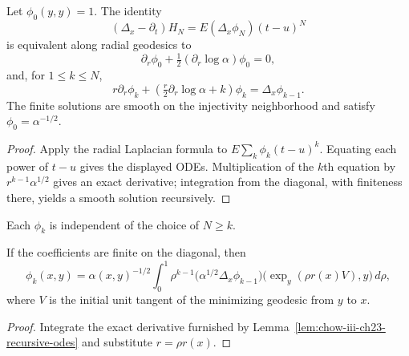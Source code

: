 \begin{lemma}
\label{lem:chow-iii-ch23-recursive-odes}
Let $\phi_0(y,y)=1$.  The identity
\[
(\Delta_x-\partial_t)H_N=E(\Delta_x\phi_N)(t-u)^N
\]
is equivalent along radial geodesics to
\[
\partial_r\phi_0+\tfrac12(\partial_r\log\alpha)\phi_0=0,
\]
and, for $1\le k\le N$,
\[
r\partial_r\phi_k+\left(\tfrac r2\partial_r\log\alpha+k\right)\phi_k
=\Delta_x\phi_{k-1}.
\]
The finite solutions are smooth on the injectivity neighborhood and satisfy
\(\phi_0=\alpha^{-1/2}\).
\end{lemma}
\begin{proof}
\sketch Apply the radial Laplacian formula to $E\sum_k\phi_k(t-u)^k$.  Equating each
power of $t-u$ gives the displayed ODEs.  Multiplication of the $k$th equation
by $r^{k-1}\alpha^{1/2}$ gives an exact derivative; integration from the
diagonal, with finiteness there, yields a smooth solution recursively.
\end{proof}

\begin{remark}[Independence of $N$]
\label{rem:chow-iii-ch23-coefficients-independent}
Each $\phi_k$ is independent of the choice of $N\ge k$.
\end{remark}

\begin{lemma}
\label{lem:chow-iii-ch23-recursive-formula}
If the coefficients are finite on the diagonal, then
\[
\phi_k(x,y)=\alpha(x,y)^{-1/2}\int_0^1\rho^{k-1}
 \bigl(\alpha^{1/2}\Delta_x\phi_{k-1}\bigr)
 \bigl(\exp_y(\rho r(x)V),y\bigr)\,d\rho,
\]
where $V$ is the initial unit tangent of the minimizing geodesic from $y$ to
$x$.
\end{lemma}
\begin{proof}
\sketch Integrate the exact derivative furnished by
Lemma~\ref{lem:chow-iii-ch23-recursive-odes} and substitute
$r=\rho r(x)$.
\end{proof}


